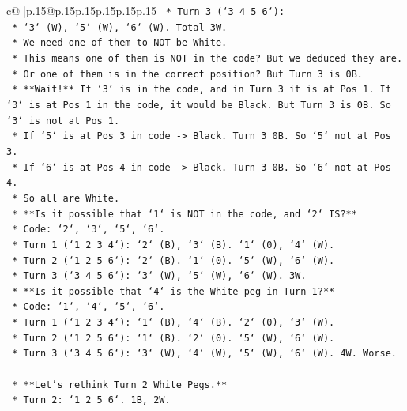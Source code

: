 \documentclass{article}
\begin{document}
{\begin{supertabular}{c@{$\;$}|p{.15\linewidth}@{}p{.15\linewidth}p{.15\linewidth}p{.15\linewidth}p{.15\linewidth}p{.15\linewidth}}
{{{\texttt{        *   Turn 3 (`3 4 5 6`):} \\
\texttt{            *   `3` (W), `5` (W), `6` (W). Total 3W.} \\
\texttt{            *   We need one of them to NOT be White.} \\
\texttt{            *   This means one of them is NOT in the code? But we deduced they are.} \\
\texttt{            *   Or one of them is in the correct position? But Turn 3 is 0B.} \\
\texttt{            *   **Wait!** If `3` is in the code, and in Turn 3 it is at Pos 1. If `3` is at Pos 1 in the code, it would be Black. But Turn 3 is 0B. So `3` is not at Pos 1.} \\
\texttt{            *   If `5` is at Pos 3 in code {-}> Black. Turn 3 0B. So `5` not at Pos 3.} \\
\texttt{            *   If `6` is at Pos 4 in code {-}> Black. Turn 3 0B. So `6` not at Pos 4.} \\
\texttt{            *   So all are White.} \\
\texttt{            *   **Is it possible that `1` is NOT in the code, and `2` IS?**} \\
\texttt{                *   Code: `2`, `3`, `5`, `6`.} \\
\texttt{                *   Turn 1 (`1 2 3 4`): `2` (B), `3` (B). `1` (0), `4` (W).} \\
\texttt{                *   Turn 2 (`1 2 5 6`): `2` (B). `1` (0). `5` (W), `6` (W).} \\
\texttt{                *   Turn 3 (`3 4 5 6`): `3` (W), `5` (W), `6` (W). 3W.} \\
\texttt{            *   **Is it possible that `4` is the White peg in Turn 1?**} \\
\texttt{                *   Code: `1`, `4`, `5`, `6`.} \\
\texttt{                *   Turn 1 (`1 2 3 4`): `1` (B), `4` (B). `2` (0), `3` (W).} \\
\texttt{                *   Turn 2 (`1 2 5 6`): `1` (B). `2` (0). `5` (W), `6` (W).} \\
\texttt{                *   Turn 3 (`3 4 5 6`): `3` (W), `4` (W), `5` (W), `6` (W). 4W. Worse.} \\
\\ 
\texttt{    *   **Let's rethink Turn 2 White Pegs.**} \\
\texttt{        *   Turn 2: `1 2 5 6`. 1B, 2W.} \\
}}}
\end{supertabular}}
\end{document}
